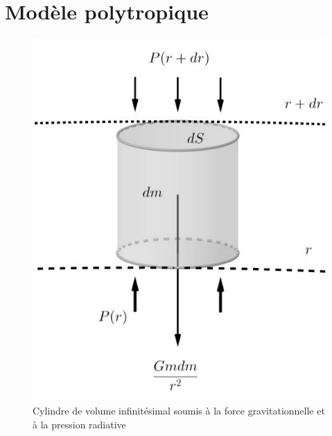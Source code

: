 


\appendix

\chapter{Modèle polytropique}\label{7.1}

\begin{figure}[H]
	\centering
	\includegraphics[scale=0.5]{images/cylindre}
	\caption[Cylindre de volume infinitésimal soumis à la force gravitationnelle et à la pression radiative - figure réalisée avec GeoGebra]{Cylindre de volume infinitésimal soumis à la force gravitationnelle et à la pression radiative}
	\label{Fig. 7.1}
\end{figure}\bigskip

